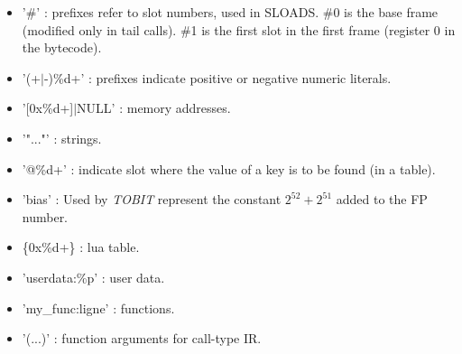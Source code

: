 \begin{itemize}
\begin{itemize}
      \item '\#' : prefixes refer to slot numbers, used in SLOADS.
        \#0 is the base frame (modified only in tail calls).
        \#1 is the first slot in the first frame (register 0 in
        the bytecode).
      \item '(+$\vert$-)\%d+' : prefixes indicate positive or negative numeric literals.
      \item '[0x\%d+]$\vert$NULL' : memory addresses.
      \item '"..."' : strings.
      \item '@\%d+' : indicate slot where the value of a key is to be found (in a table).
      \item 'bias' : Used by \emph{TOBIT} represent the constant
        $2^{52}+2^{51}$ added to the FP number.
      \item \{0x\%d+\} : lua table.
      \item 'userdata:\%p' : user data.
      \item 'my\_func:ligne' : functions.
      \item '(...)' : function arguments for call-type IR.
    \end{itemize}
\end{itemize}

